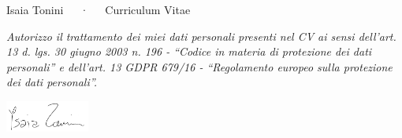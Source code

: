 \documentclass[11pt, a4paper]{awesome-cv}
\begin{document}
  \makecvheader[C]

  \makecvfooter {\today} {{Isaia Tonini}~~~·~~~Curriculum Vitae} {\thepage}

  
  
  
  
  
  
  

  \newcommand{\datipersonali}{\footnotesize
  \color{gray}
  \itshape Autorizzo il trattamento dei miei dati personali presenti nel CV ai
  sensi dell’art. 13 d. lgs. 30 giugno 2003 n. 196 - “Codice in materia di
  protezione dei dati personali” e dell’art. 13 GDPR 679/16 - “Regolamento europeo
  sulla protezione dei dati personali”.}

  \vfill %

  \datipersonali\\[2ex] \hfill
  \begin{minipage}[b]{0.95\textwidth}
    \hspace*{\fill}
    \includegraphics[width=2.75cm]{firma-no-bg.png}
  \end{minipage}
\end{document}
